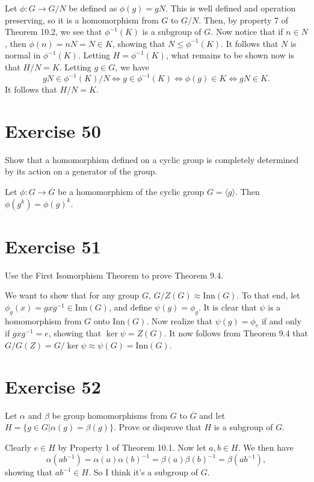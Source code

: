 \documentclass[12pt]{article}
\newcommand{\inn}{\mbox{Inn}}
\begin{document}
Let $\phi:G\to G/N$ be defined as $\phi(g)=gN$.  This is well defined
and operation preserving, so it is a homomorphism from $G$ to $G/N$.
Then, by property 7 of Theorem 10.2, we see that $\phi^{-1}(K)$ is a
subgroup of $G$.  Now notice that if $n\in N$, then $\phi(n)=nN=N\in K$,
showing that $N\leq\phi^{-1}(K)$.  It follows that $N$ is normal in $\phi^{-1}(K)$.
Letting $H=\phi^{-1}(K)$, what remains to be shown now is that $H/N=K$.  Letting $g\in G$, we have
\begin{equation*}
gN\in\phi^{-1}(K)/N\iff g\in\phi^{-1}(K)\iff\phi(g)\in K\iff gN\in K.
\end{equation*}
It follows that $H/N=K$.

\section*{Exercise 50}

Show that a homomorphism defined on a cyclic group is completely determined by its action on a generator of the group.

Let $\phi:G\to\overline{G}$ be a homomorphism of the cyclic group $G=\langle g\rangle$.
Then $\phi(g^k)=\phi(g)^k$.

\section*{Exercise 51}

Use the First Isomorphism Theorem to prove Theorem 9.4.

We want to show that for any group $G$, $G/Z(G)\approx\inn(G)$.
To that end, let $\phi_g(x)=gxg^{-1}\in\inn(G)$, and define $\psi(g)=\phi_g$.
It is clear that $\psi$ is a homomorphism from $G$ onto $\inn(G)$.
Now realize that $\psi(g)=\phi_e$ if and only if $gxg^{-1}=e$,
showing that $\ker\psi=Z(G)$.  It now follows from Theorem 9.4
that $G/G(Z)=G/\ker\psi\approx\psi(G)=\inn(G)$.

\section*{Exercise 52}

Let $\alpha$ and $\beta$ be group homomorphisms from $G$ to $\overline{G}$ and let
$H=\{g\in G|\alpha(g)=\beta(g)\}$.  Prove or disprove that $H$ is a subgroup of $G$.

Clearly $e\in H$ by Property 1 of Theorem 10.1.
Now let $a,b\in H$.  We then have
\begin{equation*}
\alpha(ab^{-1})=\alpha(a)\alpha(b)^{-1}=\beta(a)\beta(b)^{-1}=\beta(ab^{-1}),
\end{equation*}
showing that $ab^{-1}\in H$.  So I think it's a subgroup of $G$.
\end{document}

